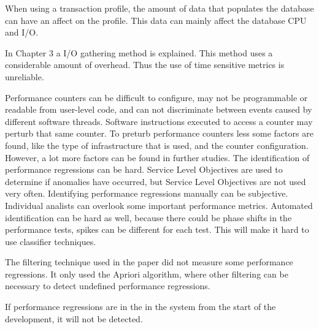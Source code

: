 When using a transaction profile, the amount of data that populates the database can have an affect on the profile. This data can mainly affect the database CPU and I/O. \cite{ghaith2015anomaly}

In Chapter 3 a I/O gathering method is explained. This method uses a considerable amount of overhead. Thus the use of time sensitive metrics is unreliable. \cite{bezemer2014detecting}

Performance counters can be difficult to configure, may not be programmable or readable from user-level code, and can not discriminate between events caused by different software threads. Software instructions executed to access a counter may perturb that same counter. To preturb performance counters less some factors are found, like the type of infrastructure that is used, and the counter configuration. However, a lot more factors can be found in further studies.\cite{AccuracyPerformanceCounter}
The identification of performance regressions can be hard. \cite{foo2010mining} Service Level Objectives are used to determine if anomalies have occurred, but Service Level Objectives are not used very often. Identifying performance regressions manually can be subjective. Individual analists can overlook some important performance metrics. Automated identification can be hard as well, because there could be phase shifts in the performance tests, spikes can be different for each test. This will make it hard to use classifier techniques.

The filtering technique used in the paper did not measure some performance regressions. It only used the Apriori algorithm, where other filtering can be necessary to detect undefined performance regressions.

If performance regressions are in the in the system from the start of the development, it will not be detected.

